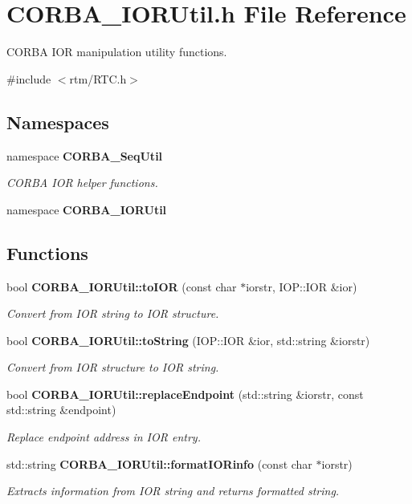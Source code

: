 \section{CORBA\_\-IORUtil.h File Reference}
\label{CORBA__IORUtil_8h}


CORBA IOR manipulation utility functions.  


{\ttfamily \#include $<$rtm/RTC.h$>$}\par
\subsection*{Namespaces}
\begin{DoxyCompactItemize}
\item 
namespace {\bf CORBA\_\-SeqUtil}


\begin{DoxyCompactList}\small\item\em CORBA IOR helper functions. \item\end{DoxyCompactList}

\item 
namespace {\bf CORBA\_\-IORUtil}
\end{DoxyCompactItemize}
\subsection*{Functions}
\begin{DoxyCompactItemize}
\item 
bool {\bf CORBA\_\-IORUtil::toIOR} (const char $\ast$iorstr, IOP::IOR \&ior)
\begin{DoxyCompactList}\small\item\em Convert from IOR string to IOR structure. \item\end{DoxyCompactList}\item 
bool {\bf CORBA\_\-IORUtil::toString} (IOP::IOR \&ior, std::string \&iorstr)
\begin{DoxyCompactList}\small\item\em Convert from IOR structure to IOR string. \item\end{DoxyCompactList}\item 
bool {\bf CORBA\_\-IORUtil::replaceEndpoint} (std::string \&iorstr, const std::string \&endpoint)
\begin{DoxyCompactList}\small\item\em Replace endpoint address in IOR entry. \item\end{DoxyCompactList}\item 
std::string {\bf CORBA\_\-IORUtil::formatIORinfo} (const char $\ast$iorstr)
\begin{DoxyCompactList}\small\item\em Extracts information from IOR string and returns formatted string. \item\end{DoxyCompactList}\end{DoxyCompactItemize}


